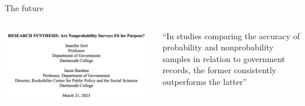 \documentclass[aspectratio=169]{beamer}
\begin{document}
\begin{frame}{The future}

\begin{columns}[T]

\begin{column}{0.59\textwidth}
\begin{center}
\includegraphics[width=\textwidth]{figures/jerit-barabas-abstract.png}
\end{center}
\end{column}

\begin{column}{0.39\textwidth}
\vspace{1.5em}
``In studies comparing the accuracy of probability and nonprobability samples in relation to government records, the former consistently outperforms the latter'' \\
\vspace{1.5em}

\end{column}

\end{columns}

\end{frame}
\end{document}
